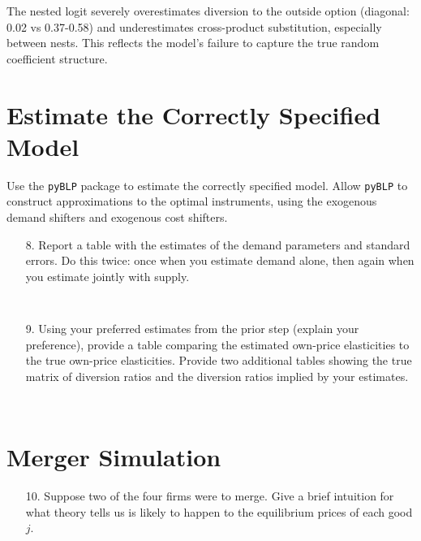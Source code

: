 \documentclass[english,11pt]{article}
\begin{document}
\begin{enumerate}
The nested logit severely overestimates diversion to the outside option (diagonal: 0.02 vs 0.37-0.58) and underestimates cross-product substitution, especially between nests. This reflects the model's failure to capture the true random coefficient structure.

\section{Estimate the Correctly Specified Model}

Use the \texttt{pyBLP} package to estimate the correctly specified model. Allow
\texttt{pyBLP} to construct approximations to the optimal instruments, using the
exogenous demand shifters and exogenous cost shifters.

\begin{enumerate}
\item[8.] Report a table with the estimates of the demand
parameters and standard errors. Do this twice: once when you estimate demand
alone, then again when you estimate jointly with supply.

\begin{verbatim}
    
\end{verbatim}

\item[9.] Using your preferred estimates from the prior step (explain your
preference), provide a table comparing the estimated own-price elasticities
to the true own-price elasticities. Provide two additional tables showing
the true matrix of diversion ratios and the diversion ratios implied by your
estimates.

\begin{verbatim}
    
\end{verbatim}

\end{enumerate}

\section{Merger Simulation}

\begin{enumerate}
\item[10.] Suppose two of the four firms were to merge. Give a brief
intuition for what theory tells us is likely to happen to the equilibrium
prices of each good $j$.




\end{enumerate}
\end{enumerate}
\end{document}
